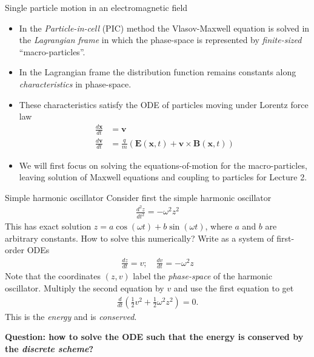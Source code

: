 \documentclass[pdf]{beamer}
\newcommand{\mvec}[1]{\mathbf{#1}}
\theoremstyle{definition}
\begin{document}
\begin{frame}{Single particle motion in an electromagnetic field}
  \small%
  \begin{itemize}
  \item In the \emph{Particle-in-cell} (PIC) method the Vlasov-Maxwell
    equation is solved in the \emph{Lagrangian frame} in which the
    phase-space is represented by \emph{finite-sized}
    ``macro-particles''.
  \item In the Lagrangian frame the distribution
    function remains constants along \emph{characteristics} in
    phase-space.
  \item These characteristics satisfy the ODE of particles moving
    under Lorentz force law
    \begin{align*}
      \frac{d\mvec{x}}{dt} &= \mvec{v} \\
      \frac{d\mvec{v}}{dt} &= \frac{q}{m}(\mvec{E}(\mvec{x},t) + \mvec{v}\times\mvec{B}(\mvec{x},t))
    \end{align*}
  \item We will first focus on solving the equations-of-motion for
    the macro-particles, leaving solution of Maxwell equations and
    coupling to particles for Lecture 2.
  \end{itemize}
\end{frame}

\begin{frame}{Simple harmonic oscillator}
  \small%
  Consider first the simple harmonic oscillator
  \begin{align*}
    \frac{d^2z}{dt^2} = -\omega^2 z^2
  \end{align*}
  This has exact solution $z = a\cos(\omega t) + b\sin(\omega t)$,
  where $a$ and $b$ are arbitrary constants. How to solve this
  numerically? Write as a system of first-order ODEs
  \begin{align*}
    \frac{dz}{dt} = v; \quad \frac{dv}{dt} = -\omega^2 z
  \end{align*}
  Note that the coordinates $(z,v)$ label the \emph{phase-space} of
  the harmonic oscillator. Multiply the second equation by $v$ and use
  the first equation to get
  \begin{align*}
    \frac{d}{dt}\left(\frac{1}{2} v^2 + \frac{1}{2}\omega^2 z^2\right) = 0.
  \end{align*}
  This is the \emph{energy} and is \emph{conserved}.%
  
  \bf{Question: how to solve the ODE such that the energy is conserved
    by the \emph{discrete scheme}?}
\end{frame}
\end{document}

